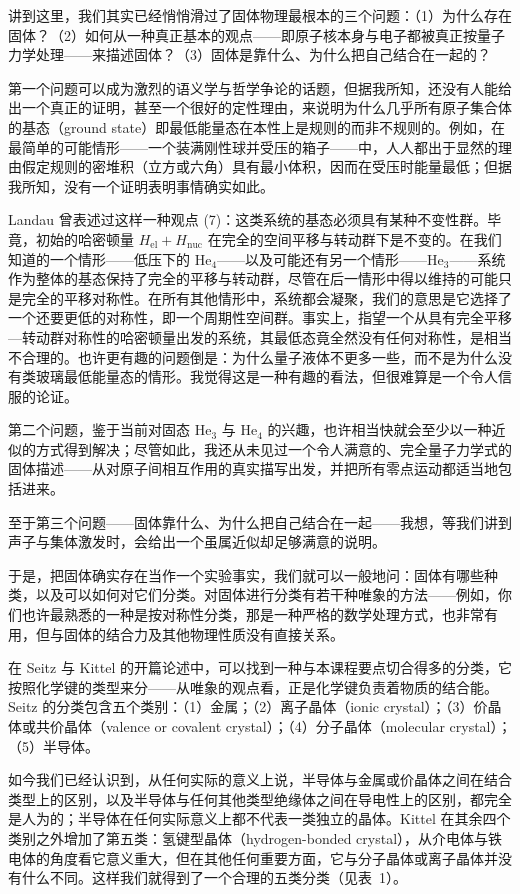 讲到这里，我们其实已经悄悄滑过了固体物理最根本的三个问题：（1）为什么存在固体？（2）如何从一种真正基本的观点——即原子核本身与电子都被真正按量子力学处理——来描述固体？（3）固体是靠什么、为什么把自己结合在一起的？

第一个问题可以成为激烈的语义学与哲学争论的话题，但据我所知，还没有人能给出一个真正的证明，甚至一个很好的定性理由，来说明为什么几乎所有原子集合体的基态（ground state）即最低能量态在本性上是规则的而非不规则的。例如，在最简单的可能情形——一个装满刚性球并受压的箱子——中，人人都出于显然的理由假定规则的密堆积（立方或六角）具有最小体积，因而在受压时能量最低；但据我所知，没有一个证明表明事情确实如此。

Landau 曾表述过这样一种观点 (7)：这类系统的基态必须具有某种不变性群。毕竟，初始的哈密顿量 $H_{\mathrm{el}}+H_{\mathrm{nuc}}$ 在完全的空间平移与转动群下是不变的。在我们知道的一个情形——低压下的 $\mathrm{He}_4$——以及可能还有另一个情形——$\mathrm{He}_3$——系统作为整体的基态保持了完全的平移与转动群，尽管在后一情形中得以维持的可能只是完全的平移对称性。在所有其他情形中，系统都会凝聚，我们的意思是它选择了一个还要更低的对称性，即一个周期性空间群。事实上，指望一个从具有完全平移—转动群对称性的哈密顿量出发的系统，其最低态竟全然没有任何对称性，是相当不合理的。也许更有趣的问题倒是：为什么量子液体不更多一些，而不是为什么没有类玻璃最低能量态的情形。我觉得这是一种有趣的看法，但很难算是一个令人信服的论证。

第二个问题，鉴于当前对固态 $\mathrm{He}_3$ 与 $\mathrm{He}_4$ 的兴趣，也许相当快就会至少以一种近似的方式得到解决；尽管如此，我还从未见过一个令人满意的、完全量子力学式的固体描述——从对原子间相互作用的真实描写出发，并把所有零点运动都适当地包括进来。

至于第三个问题——固体靠什么、为什么把自己结合在一起——我想，等我们讲到声子与集体激发时，会给出一个虽属近似却足够满意的说明。

于是，把固体确实存在当作一个实验事实，我们就可以一般地问：固体有哪些种类，以及可以如何对它们分类。对固体进行分类有若干种唯象的方法——例如，你们也许最熟悉的一种是按对称性分类，那是一种严格的数学处理方式，也非常有用，但与固体的结合力及其他物理性质没有直接关系。

在 Seitz 与 Kittel 的开篇论述中，可以找到一种与本课程要点切合得多的分类，它按照化学键的类型来分——从唯象的观点看，正是化学键负责着物质的结合能。Seitz 的分类包含五个类别：（1）金属；（2）离子晶体（ionic crystal）；（3）价晶体或共价晶体（valence or covalent crystal）；（4）分子晶体（molecular crystal）；（5）半导体。

如今我们已经认识到，从任何实际的意义上说，半导体与金属或价晶体之间在结合类型上的区别，以及半导体与任何其他类型绝缘体之间在导电性上的区别，都完全是人为的；半导体在任何实际意义上都不代表一类独立的晶体。Kittel 在其余四个类别之外增加了第五类：氢键型晶体（hydrogen-bonded crystal），从介电体与铁电体的角度看它意义重大，但在其他任何重要方面，它与分子晶体或离子晶体并没有什么不同。这样我们就得到了一个合理的五类分类（见表~1）。

